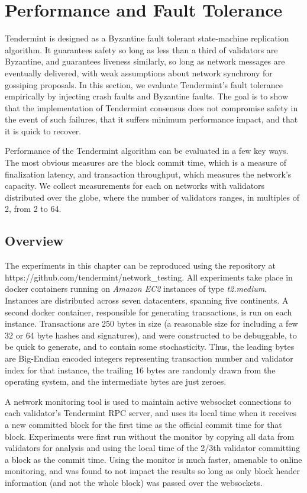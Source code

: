 \chapter{Performance and Fault Tolerance}
\label{ch:performance}

Tendermint is designed as a Byzantine fault tolerant state-machine replication algorithm.
It guarantees safety so long as less than a third of validators are Byzantine, 
and guarantees liveness similarly, so long as network messages are eventually delivered,
with weak assumptions about network synchrony for gossiping proposals.
In this section, we evaluate Tendermint's fault tolerance empirically by injecting 
crash faults and Byzantine faults.
The goal is to show that the implementation of Tendermint consensus does not compromise safety in the event of such failures,
that it suffers minimum performance impact, and that it is quick to recover.

Performance of the Tendermint algorithm can be evaluated in a few key ways.
The most obvious measures are the block commit time, which is a measure of finalization latency, 
and transaction throughput, which measures the network's capacity.
We collect measurements for each on networks with validators distributed over the globe, 
where the number of validators ranges, in multiples of 2, from 2 to 64.

\section{Overview}

The experiments in this chapter can be reproduced using the repository at https://github.com/tendermint/network\_testing.
All experiments take place in docker containers running on \emph{Amazon EC2} instances of type \emph{t2.medium}.
Instances are distributed across seven datacenters, spanning five continents.
A second docker container, responsible for generating transactions, is run on each instance.
Transactions are 250 bytes in size (a reasonable size for including a few 32 or 64 byte hashes and signatures),
and were constructed to be debuggable, to be quick to generate, and to contain some stochasticity.
Thus, the leading bytes are Big-Endian encoded integers 
representing transaction number and validator index for that instance,
the trailing 16 bytes are randomly drawn from the operating system, 
and the intermediate bytes are just zeroes.

A network monitoring tool is used to maintain active websocket connections to each validator's Tendermint RPC server,
and uses its local time when it receives a new committed block for the first time as the official commit time for that block.
Experiments were first run without the monitor by copying all data from validators for analysis and using the local time
of the 2/3th validator committing a block as the commit time. 
Using the monitor is much faster, amenable to online monitoring, and was found to not impact the results 
so long as only block header information (and not the whole block) was passed over the websockets.

